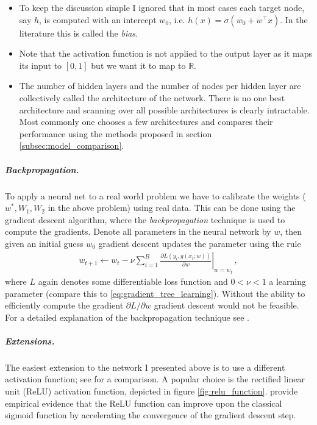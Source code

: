 \begin{remark}\hfill
    \begin{itemize}
        \item  To keep the discussion simple I ignored that in most cases each target
            node, say $h$, is computed with an intercept $w_0$, i.e. $h(x) = \sigma(w_0 +
            w^\top x)$. In the literature this is called the \emph{bias}.
        \item Note that the activation function is not applied to the output layer
            as it maps its input to $[0, 1]$ but we want it to map to $\mathbb{R}$.
        \item The number of hidden layers and the number of nodes per hidden layer are
            collectively called the architecture of the network. There is no one best
            architecture and scanning over all possible architectures is clearly
            intractable. Most commonly one chooses a few architectures and compares
            their performance using the methods proposed in section
            \ref{subsec:model_comparison}.
    \end{itemize}
\end{remark}


\subparagraph{Backpropagation.}
To apply a neural net to a real world problem we have to calibrate the weights ($w^*,
W_1, W_2$ in the above problem) using real data. This can be done using the gradient
descent algorithm, where the \emph{backpropagation} technique is used to compute the
gradients. Denote all parameters in the neural network by $w$, then given an initial
guess $w_0$ gradient descent updates the parameter using the rule
\begin{align*}
    w_{t+1} \leftarrow w_t - \nu \sum_{i=1}^B \left.\frac{\partial L\left(y_i, g(x_i;
        w)\right)}{\partial w} \right\vert_{w = w_t} \,,
\end{align*}
where $L$ again denotes some differentiable loss function and $0 < \nu < 1$ a learning
parameter (compare this to \ref{eq:gradient_tree_learning}).  Without the ability to
efficiently compute the gradient $\partial L / \partial w$ gradient descent would not be
feasible. For a detailed explanation of the backpropagation technique see
\cite{Goodfellow.2016}.


\subparagraph{Extensions.}

The easiest extension to the network I presented above is to use a different activation
function; see \cite{Hara.1994} for a comparison. A popular choice is the rectified
linear unit (ReLU) activation function, depicted in figure \ref{fig:relu_function}.
\cite{Hinton.2017} provide empirical evidence that the ReLU function can improve upon
the classical sigmoid function by accelerating the convergence of the gradient descent
step.

